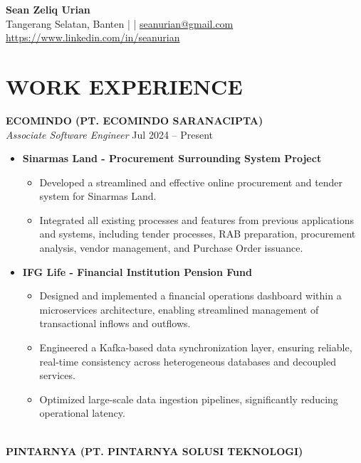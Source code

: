 \documentclass[a4paper,10pt]{article}
\begin{document}
\begin{center}
    {\LARGE \textbf{Sean Zeliq Urian}} \\
    \vspace{0.5em}
    Tangerang Selatan, Banten \quad |  \quad | \quad \href{mailto:seanurian@gmail.com}{seanurian@gmail.com} \\
    \href{https://www.linkedin.com/in/seanurian}{https://www.linkedin.com/in/seanurian}
\end{center}

\vspace{1em}
\section*{WORK EXPERIENCE}

\textbf{ECOMINDO (PT. ECOMINDO SARANACIPTA)} \\
\textit{Associate Software Engineer} \hfill Jul 2024 -- Present
\begin{itemize}
    \item \textbf{Sinarmas Land - Procurement Surrounding System Project}
    \begin{itemize}
        \item Developed a streamlined and effective online procurement and tender system for Sinarmas Land.
        \item Integrated all existing processes and features from previous applications and systems, including tender processes, RAB preparation, procurement analysis, vendor management, and Purchase Order issuance.
    \end{itemize}
    \item \textbf{IFG Life - Financial Institution Pension Fund}
    \begin{itemize}
        \item Designed and implemented a financial operations dashboard within a microservices architecture, enabling streamlined management of transactional inflows and outflows.
        \item Engineered a Kafka-based data synchronization layer, ensuring reliable, real-time consistency across heterogeneous databases and decoupled services.
        \item Optimized large-scale data ingestion pipelines, significantly reducing operational latency.
    \end{itemize}
\end{itemize} \\
\textbf{PINTARNYA (PT. PINTARNYA SOLUSI TEKNOLOGI)} \\
\end{document}
